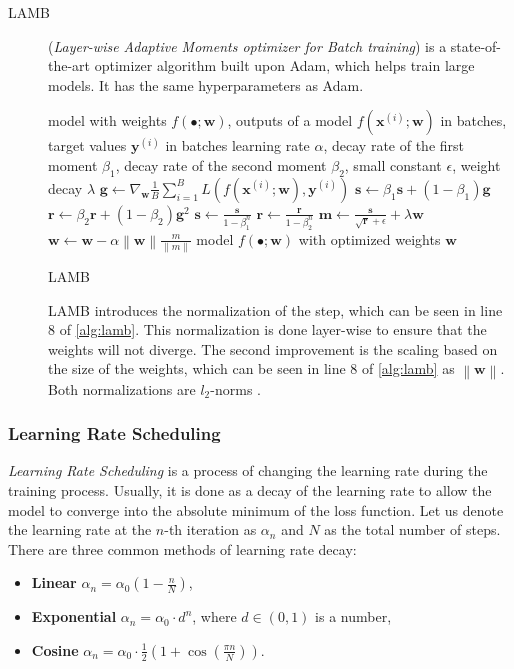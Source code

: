 \begin{description}
    \item[LAMB] (\emph{Layer-wise Adaptive Moments optimizer for Batch training}) \cite{lamb} is a state-of-the-art optimizer algorithm built upon Adam, which helps train large models.
    It has the same hyperparameters as Adam.
    \begin{algorithm}
        \begin{algorithmic}[1]
        \Require model with weights $f(\bullet;\pmb{w})$, outputs of a model $f(\pmb{x}^{(i)};\pmb{w})$ in batches, target values $\pmb{y}^{(i)}$ in batches
        \Require learning rate $\alpha$, decay rate of the first moment $\beta_1$, decay rate of the second moment $\beta_2$, small constant $\epsilon$, weight decay $\lambda$
            \State $\pmb{g} \gets \nabla_{\pmb{w}} \frac1B \sum_{i=1}^B L(f(\pmb{x}^{(i)};\pmb{w}),\pmb{y}^{(i)})$
            \State $\pmb{s} \gets \beta_1 \pmb{s} + (1 - \beta_1) \pmb{g}$
            \State $\pmb{r} \gets \beta_2 \pmb{r} + (1 - \beta_2) \pmb{g}^2$
            \State $\pmb{s} \gets \frac{\pmb{s}}{1 - \beta_1^n}$
            \State $\pmb{r} \gets \frac{\pmb{r}}{1 - \beta_2^n}$
            \State $\pmb{m} \gets \frac{\pmb{s}}{\sqrt{\pmb{r}} + \epsilon} + \lambda \pmb{w}$
            \State $\pmb{w} \gets \pmb{w} - \alpha  \left\lVert \pmb{w} \right\rVert  \frac{m}{\left\lVert m \right\rVert}$
        \EndFor
        \Ensure model $f(\bullet;\pmb{w})$ with optimized weights $\pmb{w}$
        \end{algorithmic}
        \caption{LAMB}
        \label{alg:lamb}
    \end{algorithm}
    LAMB introduces the normalization of the step, which can be seen in line 8 of \cref{alg:lamb}.
    This normalization is done layer-wise to ensure that the weights will not diverge.
    The second improvement is the scaling based on the size of the weights, which can be seen in line 8 of \cref{alg:lamb} as $\left\lVert \pmb{w} \right\rVert$.
    Both normalizations are $l_2$-norms \cite{lamb}.
\end{description}

\subsubsection*{Learning Rate Scheduling}
\emph{Learning Rate Scheduling} is a process of changing the learning rate during the training process.
Usually, it is done as a decay of the learning rate to allow the model to converge into the absolute minimum of the loss function.
Let us denote the learning rate at the $n$-th iteration as $\alpha_n$ and $N$ as the total number of steps.
There are three common methods of learning rate decay: 
\begin{itemize}
    \item \textbf{Linear} $\alpha_n = \alpha_0\left(1-\frac{n}{N}\right)$,
    \item \textbf{Exponential} $\alpha_n = \alpha_0\cdot d^n$, where $d \in (0,1)$ is a number,
    \item \textbf{Cosine} $\alpha_n = \alpha_0\cdot\frac12\left(1+\cos\left(\frac{\pi n}{N}\right)\right)$.
\end{itemize}
